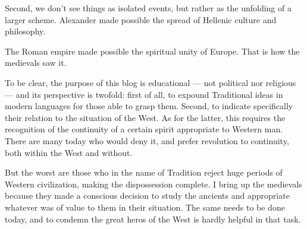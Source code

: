 \begin{footnotesize}
\begin{sffamily}
Second, we don't see things as isolated events, but rather as the unfolding of a larger scheme. Alexander made possible the spread of Hellenic culture and philosophy.

The Roman empire made possible the spiritual unity of Europe. That is how the medievals saw it.

To be clear, the purpose of this blog is educational — not political nor religious — and its perspective is twofold: first of all, to expound Traditional ideas in modern languages for those able to grasp them. Second, to indicate specifically their relation to the situation of the West. As for the latter, this requires the recognition of the continuity of a certain spirit appropriate to Western man. There are many today who would deny it, and prefer revolution to continuity, both within the West and without.

But the worst are those who in the name of Tradition reject huge periods of Western civilization, making the dispossession complete. I bring up the medievals because they made a conscious decision to study the ancients and appropriate whatever was of value to them in their situation. The same needs to be done today, and to condemn the great heros of the West is hardly helpful in that task.


\end{sffamily}\end{footnotesize}
